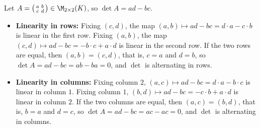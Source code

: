 \begin{exercisesolution}
\label{sol:det_2x2_alternating_bilinear}
Let $A = \left(\begin{smallmatrix} a & b \\ c & d \end{smallmatrix}\right) \in \M_{2 \times 2}(K)$, so $\det A = ad - bc$.

\begin{itemize}
    \item \textbf{Linearity in rows:}
    Fixing $(c, d)$, the map $(a, b) \mapsto ad - bc = d \cdot a - c \cdot b$ is linear in the first row.
    Fixing $(a, b)$, the map $(c, d) \mapsto ad - bc = -b \cdot c + a \cdot d$ is linear in the second row.
    If the two rows are equal, then $(a, b) = (c, d)$, that is, $c = a$ and $d = b$, so $\det A = ad - bc = ab - ba = 0$, and $\det$ is alternating in rows.

    \item \textbf{Linearity in columns:}
    Fixing column $2$, $(a, c) \mapsto ad - bc = d \cdot a - b \cdot c$ is linear in column $1$.
    Fixing column $1$, $(b, d) \mapsto ad - bc = -c \cdot b + a \cdot d$ is linear in column $2$.
    If the two columns are equal, then $(a, c) = (b, d)$, that is, $b = a$ and $d = c$, so $\det A = ad - bc = ac - ac = 0$, and $\det$ is alternating in columns. \qedhere
\end{itemize}
\end{exercisesolution}

